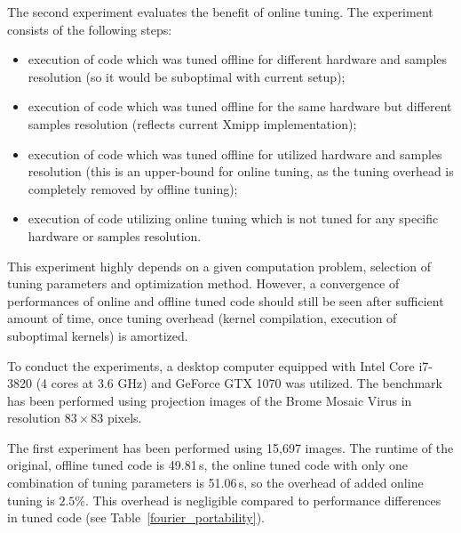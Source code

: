 \documentclass
[
    digital, %
    oneside, %
    table, %
    nolof, %
    nolot, %
    nocover %
]{fithesis3}
\begin{document}
The second experiment evaluates the benefit of online tuning. The experiment consists of the following steps:
\begin{itemize}
    \item execution of code which was tuned offline for different hardware and samples resolution (so it would be suboptimal with current setup);
    \item execution of code which was tuned offline for the same hardware but different samples resolution (reflects current Xmipp implementation);
    \item execution of code which was tuned offline for utilized hardware and samples resolution (this is an upper-bound for online tuning, as the tuning
    overhead is completely removed by offline tuning);
    \item execution of code utilizing online tuning which is not tuned for any specific hardware or samples resolution.
\end{itemize}
This experiment highly depends on a given computation problem, selection of tuning parameters and optimization method. However, a convergence of performances
of online and offline tuned code should still be seen after sufficient amount of time, once tuning overhead (kernel compilation, execution of suboptimal
kernels) is amortized.

To conduct the experiments, a desktop computer equipped with Intel Core i7-3820 (4 cores at 3.6 GHz) and GeForce GTX 1070 was utilized. The benchmark
has been performed using projection images of the Brome Mosaic Virus \cite{atom-model} in resolution $83 \times 83$ pixels.

The first experiment has been performed using 15,697 images. The runtime of the original, offline tuned code is 49.81\,s, the online tuned code with only
one combination of tuning parameters is 51.06\,s, so the overhead of added online tuning is $\mathbf{2.5\%}$. This overhead is negligible compared to
performance differences in tuned code (see Table~\ref{fourier_portability}).
\end{document}
